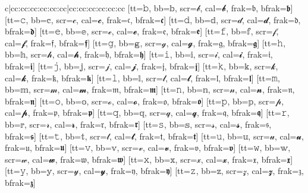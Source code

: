 \documentclass{unittest}
\begin{document}
\begin{tabular}{c|cc:cc:cc:cc:cc:cc|cc:cc:cc:cc:cc:cc}
[tt=𝚋, bb=𝕓, scr=𝒷, cal=𝓫, frak=𝔟, bfrak=𝖇]
[tt=𝚌, bb=𝕔, scr=𝒸, cal=𝓬, frak=𝔠, bfrak=𝖈]
[tt=𝚍, bb=𝕕, scr=𝒹, cal=𝓭, frak=𝔡, bfrak=𝖉]
[tt=𝚎, bb=𝕖, scr=ℯ, cal=𝓮, frak=𝔢, bfrak=𝖊]
[tt=𝚏, bb=𝕗, scr=𝒻, cal=𝓯, frak=𝔣, bfrak=𝖋]
[tt=𝚐, bb=𝕘, scr=ℊ, cal=𝓰, frak=𝔤, bfrak=𝖌]
[tt=𝚑, bb=𝕙, scr=𝒽, cal=𝓱, frak=𝔥, bfrak=𝖍]
[tt=𝚒, bb=𝕚, scr=𝒾, cal=𝓲, frak=𝔦, bfrak=𝖎]
[tt=𝚓, bb=𝕛, scr=𝒿, cal=𝓳, frak=𝔧, bfrak=𝖏]
[tt=𝚔, bb=𝕜, scr=𝓀, cal=𝓴, frak=𝔨, bfrak=𝖐]
[tt=𝚕, bb=𝕝, scr=𝓁, cal=𝓵, frak=𝔩, bfrak=𝖑]
[tt=𝚖, bb=𝕞, scr=𝓂, cal=𝓶, frak=𝔪, bfrak=𝖒]
[tt=𝚗, bb=𝕟, scr=𝓃, cal=𝓷, frak=𝔫, bfrak=𝖓]
[tt=𝚘, bb=𝕠, scr=ℴ, cal=𝓸, frak=𝔬, bfrak=𝖔]
[tt=𝚙, bb=𝕡, scr=𝓅, cal=𝓹, frak=𝔭, bfrak=𝖕]
[tt=𝚚, bb=𝕢, scr=𝓆, cal=𝓺, frak=𝔮, bfrak=𝖖]
[tt=𝚛, bb=𝕣, scr=𝓇, cal=𝓻, frak=𝔯, bfrak=𝖗]
[tt=𝚜, bb=𝕤, scr=𝓈, cal=𝓼, frak=𝔰, bfrak=𝖘]
[tt=𝚝, bb=𝕥, scr=𝓉, cal=𝓽, frak=𝔱, bfrak=𝖙]
[tt=𝚞, bb=𝕦, scr=𝓊, cal=𝓾, frak=𝔲, bfrak=𝖚]
[tt=𝚟, bb=𝕧, scr=𝓋, cal=𝓿, frak=𝔳, bfrak=𝖛]
[tt=𝚠, bb=𝕨, scr=𝓌, cal=𝔀, frak=𝔴, bfrak=𝖜]
[tt=𝚡, bb=𝕩, scr=𝓍, cal=𝔁, frak=𝔵, bfrak=𝖝]
[tt=𝚢, bb=𝕪, scr=𝓎, cal=𝔂, frak=𝔶, bfrak=𝖞]
[tt=𝚣, bb=𝕫, scr=𝓏, cal=𝔃, frak=𝔷, bfrak=𝖟]
\bottomrule
\end{tabular}
\end{document}
